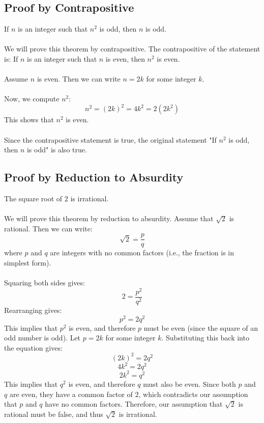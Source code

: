 \subsection{Proof by Contrapositive}

If \( n \) is an integer such that \( n^2 \) is odd, then \( n \) is odd.
\\\\
	We will prove this theorem by contrapositive. The contrapositive of the statement is: If \( n \) is an integer such that \( n \) is even, then \( n^2 \) is even.
\\\\
	Assume \( n \) is even. Then we can write \( n = 2k \) for some integer \( k \).
\\\\
	Now, we compute \( n^2 \):
	\[
		n^2 = (2k)^2 = 4k^2 = 2(2k^2)
	\]
	This shows that \( n^2 \) is even.
\\\\
	Since the contrapositive statement is true, the original statement "If \( n^2 \) is odd, then \( n \) is odd" is also true.
\QED

\subsection{Proof by Reduction to Absurdity}

The square root of \( 2 \) is irrational.
\\\\
	We will prove this theorem by reduction to absurdity. Assume that \( \sqrt{2} \) is rational. Then we can write:
	\[
		\sqrt{2} = \frac{p}{q}
	\]
	where \( p \) and \( q \) are integers with no common factors (i.e., the fraction is in simplest form).
\\\\
	Squaring both sides gives:
	\[
		2 = \frac{p^2}{q^2}
	\]
	Rearranging gives:
	\[
		p^2 = 2q^2
	\]
	This implies that \( p^2 \) is even, and therefore \( p \) must be even (since the square of an odd number is odd).
	Let \( p = 2k \) for some integer \( k \). Substituting this back into the equation gives:
	\[
		(2k)^2 = 2q^2
	\]
	\[
		4k^2 = 2q^2
	\]
	\[
		2k^2 = q^2
	\]
	This implies that \( q^2 \) is even, and therefore \( q \) must also be even.
	Since both \( p \) and \( q \) are even, they have a common factor of \( 2 \), which contradicts our assumption that \( p \) and \( q \) have no common factors.
	Therefore, our assumption that \( \sqrt{2} \) is rational must be false, and thus \( \sqrt{2} \) is irrational.

